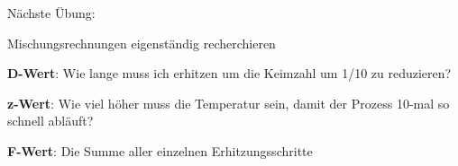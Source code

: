 \documentclass[aspectratio=169,9pt]{beamer}
\newcommand{\pp}{\par \vspace*{2mm}}
\begin{document}
\begin{frame}

\begin{center}
\Large
Nächste Übung: \par \large Mischungsrechnungen eigenständig recherchieren
\end{center}

\end{frame}


\begin{frame}
\textbf{D-Wert}: Wie lange muss ich erhitzen um die Keimzahl um 1/10 zu reduzieren?
\pp
\textbf{z-Wert}: Wie viel höher muss die Temperatur sein, damit der Prozess 10-mal so schnell abläuft?
\pp 
\textbf{F-Wert}: Die Summe aller einzelnen Erhitzungsschritte

\end{frame}
\end{document}
